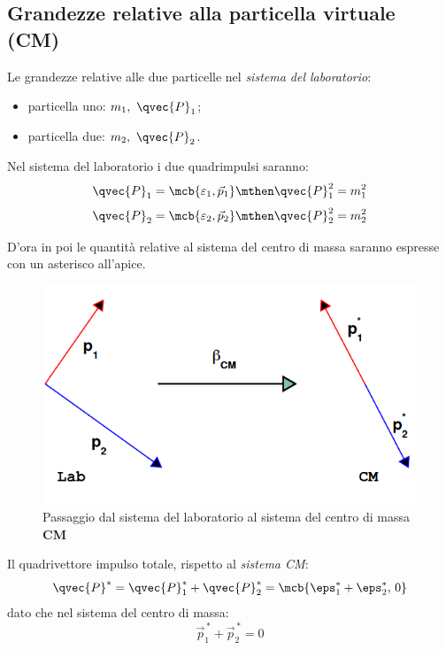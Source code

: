 \subsection{Grandezze relative alla particella virtuale 
(CM)}
Le grandezze relative alle due particelle nel \textit{sistema del laboratorio}:
\begin{itemize}
  \item particella uno: $m_1,\ \qvec{P}_1$;
  \item particella due: $m_2,\ \qvec{P}_2$.
\end{itemize}
Nel sistema del laboratorio i due quadrimpulsi saranno:
\begin{equation}
  \qvec{P}_1 = \mcb{\varepsilon_1,\vec{p}_1}
  \mthen
  \qvec{P}_{1}^{2} = m_1^2
\end{equation}
\begin{equation}
  \qvec{P}_2 = \mcb{\varepsilon_2,\vec{p}_2}
  \mthen
  \qvec{P}_{2}^{2} = m_2^2
\end{equation}

\begin{note}[]
  D'ora in poi le quantità relative al sistema del centro di massa saranno
  espresse con un asterisco all'apice.
\end{note}

\begin{figure}[ht]
  \centering
  \includegraphics[scale=0.4]{./img/2020_03_20/particles1.png}
  \caption{Passaggio dal sistema del laboratorio al sistema del centro di massa
  \textbf{CM}}
  \label{fig:particles1}
\end{figure}

Il quadrivettore impulso totale, rispetto al \textit{sistema CM}:
\begin{equation}
  \qvec{P}^\ast
  = \qvec{P}_1^\ast + \qvec{P}_2^\ast
  = \mcb{\eps_1^\ast + \eps_2^\ast,\, 0}
\end{equation}
dato che nel sistema del centro di massa:
\begin{equation}
  \vec{p}_{1}^{\,\ast} + \vec{p}_{2}^{\,\ast} = 0
\end{equation}

